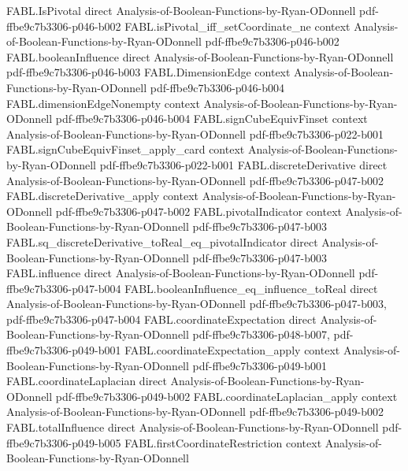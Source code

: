 \begin{theorem}
\proofstep
  {FABL.IsPivotal}
  {direct}
  {Analysis-of-Boolean-Functions-by-Ryan-ODonnell}
  {pdf-ffbe9c7b3306-p046-b002}
\proofstep
  {FABL.isPivotal_iff_setCoordinate_ne}
  {context}
  {Analysis-of-Boolean-Functions-by-Ryan-ODonnell}
  {pdf-ffbe9c7b3306-p046-b002}
\proofstep
  {FABL.booleanInfluence}
  {direct}
  {Analysis-of-Boolean-Functions-by-Ryan-ODonnell}
  {pdf-ffbe9c7b3306-p046-b003}
\proofstep
  {FABL.DimensionEdge}
  {context}
  {Analysis-of-Boolean-Functions-by-Ryan-ODonnell}
  {pdf-ffbe9c7b3306-p046-b004}
\proofstep
  {FABL.dimensionEdgeNonempty}
  {context}
  {Analysis-of-Boolean-Functions-by-Ryan-ODonnell}
  {pdf-ffbe9c7b3306-p046-b004}
\proofstep
  {FABL.signCubeEquivFinset}
  {context}
  {Analysis-of-Boolean-Functions-by-Ryan-ODonnell}
  {pdf-ffbe9c7b3306-p022-b001}
\proofstep
  {FABL.signCubeEquivFinset_apply_card}
  {context}
  {Analysis-of-Boolean-Functions-by-Ryan-ODonnell}
  {pdf-ffbe9c7b3306-p022-b001}
\proofstep
  {FABL.discreteDerivative}
  {direct}
  {Analysis-of-Boolean-Functions-by-Ryan-ODonnell}
  {pdf-ffbe9c7b3306-p047-b002}
\proofstep
  {FABL.discreteDerivative_apply}
  {context}
  {Analysis-of-Boolean-Functions-by-Ryan-ODonnell}
  {pdf-ffbe9c7b3306-p047-b002}
\proofstep
  {FABL.pivotalIndicator}
  {context}
  {Analysis-of-Boolean-Functions-by-Ryan-ODonnell}
  {pdf-ffbe9c7b3306-p047-b003}
\proofstep
  {FABL.sq_discreteDerivative_toReal_eq_pivotalIndicator}
  {direct}
  {Analysis-of-Boolean-Functions-by-Ryan-ODonnell}
  {pdf-ffbe9c7b3306-p047-b003}
\proofstep
  {FABL.influence}
  {direct}
  {Analysis-of-Boolean-Functions-by-Ryan-ODonnell}
  {pdf-ffbe9c7b3306-p047-b004}
\proofstep
  {FABL.booleanInfluence_eq_influence_toReal}
  {direct}
  {Analysis-of-Boolean-Functions-by-Ryan-ODonnell}
  {pdf-ffbe9c7b3306-p047-b003,
    pdf-ffbe9c7b3306-p047-b004}
\proofstep
  {FABL.coordinateExpectation}
  {direct}
  {Analysis-of-Boolean-Functions-by-Ryan-ODonnell}
  {pdf-ffbe9c7b3306-p048-b007,
    pdf-ffbe9c7b3306-p049-b001}
\proofstep
  {FABL.coordinateExpectation_apply}
  {context}
  {Analysis-of-Boolean-Functions-by-Ryan-ODonnell}
  {pdf-ffbe9c7b3306-p049-b001}
\proofstep
  {FABL.coordinateLaplacian}
  {direct}
  {Analysis-of-Boolean-Functions-by-Ryan-ODonnell}
  {pdf-ffbe9c7b3306-p049-b002}
\proofstep
  {FABL.coordinateLaplacian_apply}
  {context}
  {Analysis-of-Boolean-Functions-by-Ryan-ODonnell}
  {pdf-ffbe9c7b3306-p049-b002}
\proofstep
  {FABL.totalInfluence}
  {direct}
  {Analysis-of-Boolean-Functions-by-Ryan-ODonnell}
  {pdf-ffbe9c7b3306-p049-b005}
\proofstep
  {FABL.firstCoordinateRestriction}
  {context}
  {Analysis-of-Boolean-Functions-by-Ryan-ODonnell}

\end{theorem}

